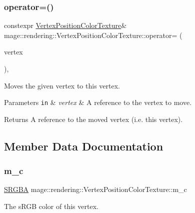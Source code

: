 \subsubsection{\texorpdfstring{operator=()}{operator=()}\hspace{0.1cm}{\footnotesize\ttfamily [2/2]}}
{\footnotesize\ttfamily constexpr \hyperlink{structmage_1_1rendering_1_1_vertex_position_color_texture}{Vertex\+Position\+Color\+Texture}\& mage\+::rendering\+::\+Vertex\+Position\+Color\+Texture\+::operator= (\begin{DoxyParamCaption}\item[{\hyperlink{structmage_1_1rendering_1_1_vertex_position_color_texture}{Vertex\+Position\+Color\+Texture} \&\&}]{vertex }\end{DoxyParamCaption})\hspace{0.3cm}{\ttfamily [default]}, {\ttfamily [noexcept]}}

Moves the given vertex to this vertex.


\begin{DoxyParams}[1]{Parameters}
\mbox{\tt in}  & {\em vertex} & A reference to the vertex to move. \\
\hline
\end{DoxyParams}
\begin{DoxyReturn}{Returns}
A reference to the moved vertex (i.\+e. this vertex). 
\end{DoxyReturn}


\subsection{Member Data Documentation}
\hypertarget{structmage_1_1rendering_1_1_vertex_position_color_texture_a50b5c17d4a6f66e5d9be323f48a892c7}{}\label{structmage_1_1rendering_1_1_vertex_position_color_texture_a50b5c17d4a6f66e5d9be323f48a892c7} 
\subsubsection{\texorpdfstring{m\+\_\+c}{m\_c}}
{\footnotesize\ttfamily \hyperlink{structmage_1_1_s_r_g_b_a}{S\+R\+G\+BA} mage\+::rendering\+::\+Vertex\+Position\+Color\+Texture\+::m\+\_\+c}

The s\+R\+GB color of this vertex. \hypertarget{structmage_1_1rendering_1_1_vertex_position_color_texture_a924a25377182f6c29ff7f50fba08113c}{}\label{structmage_1_1rendering_1_1_vertex_position_color_texture_a924a25377182f6c29ff7f50fba08113c} 
